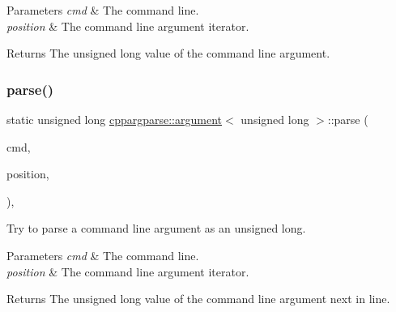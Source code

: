 \begin{DoxyParams}{Parameters}
{\em cmd} & The command line. \\
\hline
{\em position} & The command line argument iterator.\\
\hline
\end{DoxyParams}
\begin{DoxyReturn}{Returns}
The unsigned long value of the command line argument. 
\end{DoxyReturn}
\mbox{\label{structcppargparse_1_1argument_3_01unsigned_01long_01_4_aa43a6629fb21aa0527c3fadcede3a166}} 
\subsubsection{\texorpdfstring{parse()}{parse()}}
{\footnotesize\ttfamily static unsigned long \hyperlink{structcppargparse_1_1argument}{cppargparse\+::argument}$<$ unsigned long $>$\+::parse (\begin{DoxyParamCaption}\item[{const \hyperlink{types_8h_a80adf2418b7ce9fe616698efa7533ecf}{types\+::\+Command\+Line\+\_\+t} \&}]{cmd,  }\item[{const \hyperlink{types_8h_a43b4f43f8940de1bf09ced6f1b668053}{types\+::\+Command\+Line\+Position\+\_\+t} \&}]{position,  }\item[{const \hyperlink{types_8h_a003c660afe2ee9c6cc39aea966e8926d}{types\+::\+Command\+Line\+Arguments\+\_\+t} \&}]{ }\end{DoxyParamCaption})\hspace{0.3cm}{\ttfamily [inline]}, {\ttfamily [static]}}



Try to parse a command line argument as an unsigned long. 


\begin{DoxyParams}{Parameters}
{\em cmd} & The command line. \\
\hline
{\em position} & The command line argument iterator.\\
\hline
\end{DoxyParams}
\begin{DoxyReturn}{Returns}
The unsigned long value of the command line argument next in line. 
\end{DoxyReturn}
\mbox{\label{structcppargparse_1_1argument_3_01unsigned_01long_01_4_a683be63bc3df22e2cf193ebdaed10b2d}} 
